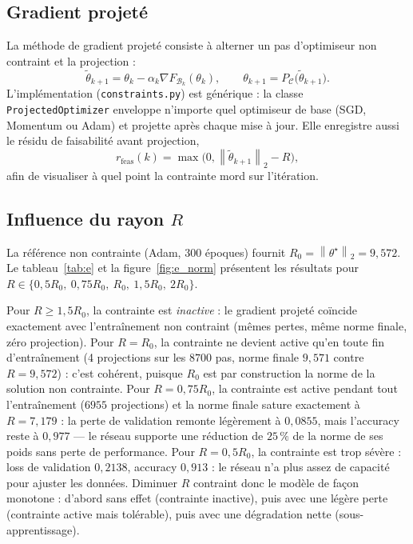 \documentclass[11pt,a4paper]{article}
\newcommand{\norm}[1]{\left\lVert #1 \right\rVert}
\begin{document}
\subsection{Gradient projeté}

La méthode de gradient projeté consiste à alterner un pas d'optimiseur non contraint et la projection :
\[
\tilde{\theta}_{k+1} = \theta_k - \alpha_k \nabla F_{\mathcal{B}_k}(\theta_k),
\qquad
\theta_{k+1} = P_{\mathcal{C}}\bigl(\tilde{\theta}_{k+1}\bigr).
\]
L'implémentation (\texttt{constraints.py}) est générique : la classe \texttt{ProjectedOptimizer} enveloppe n'importe quel optimiseur de base (SGD, Momentum ou Adam) et projette après chaque mise à jour. Elle enregistre aussi le résidu de faisabilité avant projection,
\[
r_{\mathrm{feas}}(k) = \max\bigl(0, \norm{\tilde{\theta}_{k+1}}_2 - R\bigr),
\]
afin de visualiser à quel point la contrainte mord sur l'itération.

\subsection{Influence du rayon $R$}

La référence non contrainte (Adam, $300$ époques) fournit $R_0 = \norm{\theta^\star}_2 = 9{,}572$. Le tableau~\ref{tab:e} et la figure~\ref{fig:e_norm} présentent les résultats pour $R \in \{0{,}5R_0,\ 0{,}75R_0,\ R_0,\ 1{,}5R_0,\ 2R_0\}$.

Pour $R \ge 1{,}5R_0$, la contrainte est \emph{inactive} : le gradient projeté coïncide exactement avec l'entraînement non contraint (mêmes pertes, même norme finale, zéro projection). Pour $R = R_0$, la contrainte ne devient active qu'en toute fin d'entraînement (4 projections sur les $8700$ pas, norme finale $9{,}571$ contre $R = 9{,}572$) : c'est cohérent, puisque $R_0$ est par construction la norme de la solution non contrainte. Pour $R = 0{,}75R_0$, la contrainte est active pendant tout l'entraînement ($6955$ projections) et la norme finale sature exactement à $R = 7{,}179$ : la perte de validation remonte légèrement à $0{,}0855$, mais l'accuracy reste à $0{,}977$ --- le réseau supporte une réduction de $25\,\%$ de la norme de ses poids sans perte de performance. Pour $R = 0{,}5R_0$, la contrainte est trop sévère : loss de validation $0{,}2138$, accuracy $0{,}913$ : le réseau n'a plus assez de capacité pour ajuster les données. Diminuer $R$ contraint donc le modèle de façon monotone : d'abord sans effet (contrainte inactive), puis avec une légère perte (contrainte active mais tolérable), puis avec une dégradation nette (sous-apprentissage).
\end{document}
